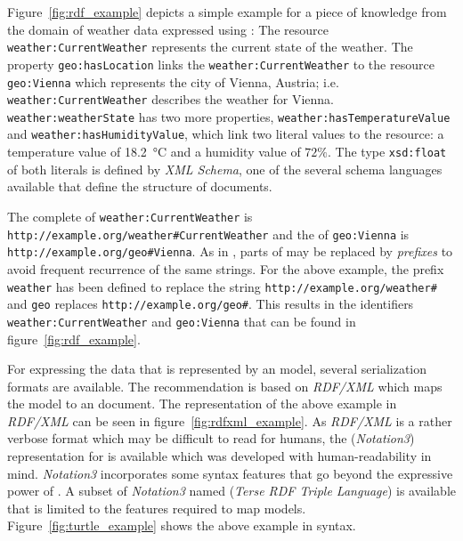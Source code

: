 Figure~\ref{fig:rdf_example} depicts a simple example for a piece of knowledge from the domain of weather data expressed using : The resource \texttt{weather:CurrentWeather} represents the current state of the weather. The property \texttt{geo:hasLocation} links the \texttt{weather:CurrentWeather} to the resource \texttt{geo:Vienna} which represents the city of Vienna, Austria; i.e. \texttt{weather:CurrentWeather} describes the weather for Vienna. \texttt{weather:weatherState} has two more properties, \texttt{weather:hasTemperatureValue} and \texttt{weather:hasHumidityValue}, which link two literal values to the resource: a temperature value of \SI{18.2}{\celsius} and a humidity value of $72 \%$. The type \texttt{xsd:float} of both literals is defined by \emph{XML Schema}, one of the several  schema languages available that define the structure of  documents.

The complete  of \texttt{weather:CurrentWeather} is \texttt{http://example.org/weather\#CurrentWeather} and the  of \texttt{geo:Vienna} is \texttt{http://example.org/geo\#Vienna}. As in , parts of  may be replaced by \emph{prefixes} to avoid frequent recurrence of the same strings. For the above example, the prefix \texttt{weather} has been defined to replace the string \texttt{http://example.org/weather\#} and \texttt{geo} replaces \texttt{http://example.org/geo\#}. This results in the identifiers \texttt{weather:CurrentWeather} and \texttt{geo:Vienna} that can be found in figure~\ref{fig:rdf_example}.

For expressing the data that is represented by an  model, several serialization formats are available. The  recommendation is based on \emph{RDF/XML} which maps the  model to an  document. The representation of the above example in \emph{RDF/XML} can be seen in figure~\ref{fig:rdfxml_example}. As \emph{RDF/XML} is a rather verbose format which may be difficult to read for humans, the  (\emph{Notation3}) representation for  is available which was developed with human-readability in mind. \emph{Notation3} incorporates some syntax features that go beyond the expressive power of . A subset of \emph{Notation3} named  (\emph{Terse RDF Triple Language}) is available that is limited to the features required to map  models. Figure~\ref{fig:turtle_example} shows the above example in  syntax.

